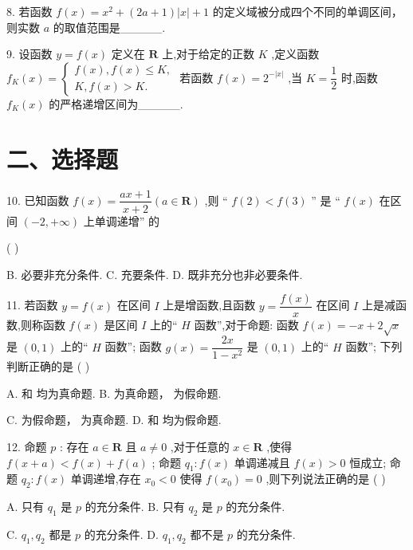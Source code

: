 8. 若函数 $f\left( x\right)  = {x}^{2} + \left( {{2a} + 1}\right) \left| x\right|  + 1$ 的定义域被分成四个不同的单调区间，则实数 $a$ 的取值范围是\_\_\_\_\_.

9. 设函数 $y = f\left( x\right)$ 定义在 $\mathbf{R}$ 上,对于给定的正数 $K$ ,定义函数 ${f}_{K}\left( x\right)  = \left\{  \begin{array}{l} f\left( x\right) ,f\left( x\right)  \leq  K, \\  K,f\left( x\right)  > K. \end{array}\right.$ 若函数 $f\left( x\right)  = {2}^{-\left| x\right| }$ ,当 $K = \dfrac{1}{2}$ 时,函数 ${f}_{K}\left( x\right)$ 的严格递增区间为\_\_\_\_\_.

\section*{二、选择题}

10. 已知函数 $f\left( x\right)  = \dfrac{{ax} + 1}{x + 2}\left( {a \in  \mathbf{R}}\right)$ ,则 “ $f\left( 2\right)  < f\left( 3\right)$ ” 是 “ $f\left( x\right)$ 在区间 $\left( {-2, + \infty }\right)$ 上单调递增” 的

( )

B. 必要非充分条件. C. 充要条件. D. 既非充分也非必要条件.

11. 若函数 $y = f\left( x\right)$ 在区间 $I$ 上是增函数,且函数 $y = \dfrac{f\left( x\right) }{x}$ 在区间 $I$ 上是减函数,则称函数 $f\left( x\right)$ 是区间 $I$ 上的“ $H$ 函数”,对于命题:  函数 $f\left( x\right)  =  - x + 2\sqrt{x}$ 是 $\left( {0,1}\right)$ 上的“ $H$ 函数”;   函数 $g\left( x\right)  = \dfrac{2x}{1 - {x}^{2}}$ 是 $\left( {0,1}\right)$ 上的“ $H$ 函数”; 下列判断正确的是 ( )

A.   和  均为真命题. B.   为真命题，  为假命题.

C.   为假命题，  为真命题. D.   和  均为假命题.

12. 命题 $p$ : 存在 $a \in  \mathbf{R}$ 且 $a \neq  0$ ,对于任意的 $x \in  \mathbf{R}$ ,使得 $f\left( {x + a}\right)  < f\left( x\right)  + f\left( a\right)$ ; 命题 ${q}_{1} : f\left( x\right)$ 单调递减且 $f\left( x\right)  > 0$ 恒成立; 命题 ${q}_{2} : f\left( x\right)$ 单调递增,存在 ${x}_{0} < 0$ 使得 $f\left( {x}_{0}\right)  = 0$ ,则下列说法正确的是 ( )

A. 只有 ${q}_{1}$ 是 $p$ 的充分条件. B. 只有 ${q}_{2}$ 是 $p$ 的充分条件.

C. ${q}_{1},{q}_{2}$ 都是 $p$ 的充分条件. D. ${q}_{1},{q}_{2}$ 都不是 $p$ 的充分条件.

